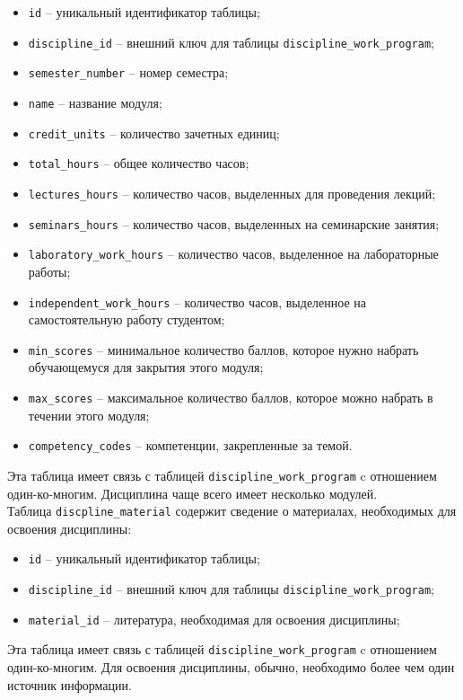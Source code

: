 \begin{itemize}
	\item \texttt{id} -- уникальный идентификатор таблицы;
	\item \texttt{discipline\_id} -- внешний ключ для таблицы \texttt{discipline\_work\_program};
	\item \texttt{semester\_number} -- номер семестра;
	\item \texttt{name} -- название модуля;
	\item \texttt{credit\_units} -- количество зачетных единиц;
	\item \texttt{total\_hours} -- общее количество часов;
	\item \texttt{lectures\_hours} -- количество часов, выделенных для проведения лекций;
	\item \texttt{seminars\_hours} -- количество часов, выделенных на семинарские занятия;
	\item \texttt{laboratory\_work\_hours} -- количество часов, выделенное на лабораторные работы;
	\item \texttt{independent\_work\_hours} -- количество часов, выделенное на самостоятельную работу студентом;
	\item \texttt{min\_scores} -- минимальное количество баллов, которое нужно набрать обучающемуся для закрытия этого модуля;
	\item \texttt{max\_scores} -- максимальное количество баллов, которое можно набрать в течении этого модуля;
	\item \texttt{competency\_codes} -- компетенции, закрепленные за темой.
\end{itemize}

Эта таблица имеет связь с таблицей \texttt{discipline\_work\_program} c отношением один-ко-многим. Дисциплина чаще всего имеет несколько модулей.\\

Таблица \texttt{discpline\_material} содержит сведение о материалах, необходимых для освоения дисциплины:

\begin{itemize}
	\item \texttt{id} -- уникальный идентификатор таблицы;
	\item \texttt{discipline\_id} -- внешний ключ для таблицы \texttt{discipline\_work\_program};
	\item \texttt{material\_id} -- литература, необходимая для освоения дисциплины;
\end{itemize}

Эта таблица имеет связь с таблицей \texttt{discipline\_work\_program} c отношением один-ко-многим. Для освоения дисциплины, обычно, необходимо более чем один источник информации.\\

